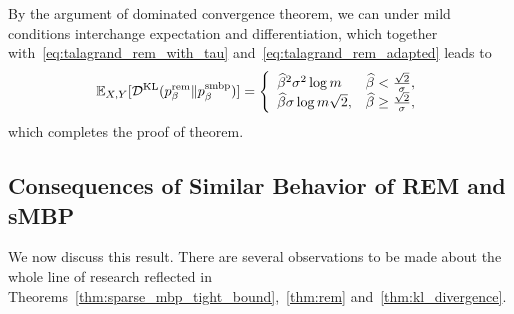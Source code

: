 By the argument of dominated convergence theorem, we can under mild conditions
interchange expectation and differentiation, which together
with~\eqref{eq:talagrand_rem_with_tau} and~\eqref{eq:talagrand_rem_adapted}
leads to
\begin{equation}
  \mathbb{E}_{X, Y}[\mathcal{D}^{\text{KL}}(p^{\mathrm{rem}}_\beta \| p^{\mathrm{smbp}}_\beta)] = 
    \left\{ 
      \begin{array}{ll}
        \widehat\beta^2 \sigma^2 \log m &
          \widehat \beta< \frac{\sqrt{2}}{\sigma},\\
        \widehat \beta \sigma \log m \sqrt{2}, & 
          \widehat \beta \ge \frac{\sqrt{2}}{\sigma},
      \end{array}
    \right.
\end{equation}
which completes the proof of theorem.
\QEDA

\subsection{Consequences of Similar Behavior of REM and sMBP}

We now discuss this result. There are several observations to be made about the
whole line of research reflected in
Theorems~\ref{thm:sparse_mbp_tight_bound},~\ref{thm:rem}
and~\ref{thm:kl_divergence}.

